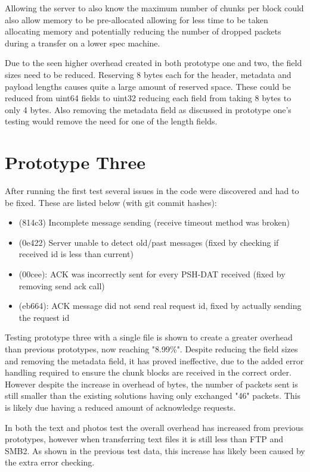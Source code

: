 Allowing the server to also know the maximum number of chunks per block could also allow memory to be pre-allocated allowing for less time to be taken allocating memory and potentially reducing the number of dropped packets during a transfer on a lower spec machine.

Due to the seen higher overhead created in both prototype one and two, the field sizes need to be reduced. Reserving 8 bytes each for the header, metadata and payload lengths causes quite a large amount of reserved space. These could be reduced from uint64 fields to uint32 reducing each field from taking 8 bytes to only 4 bytes. Also removing the metadata field as discussed in prototype one's testing would remove the need for one of the length fields.


\section{Prototype Three}
After running the first test several issues in the code were discovered and had to be fixed. These are listed below (with git commit hashes):

\begin{itemize}
    \item (814c3) Incomplete message sending (receive timeout method was broken)
    \item (0e422) Server unable to detect old/past messages (fixed by checking if received id is less than current)
    \item (00cee): ACK was incorrectly sent for every PSH-DAT received (fixed by removing send ack call)
    \item (eb664): ACK message did not send real request id, fixed by actually sending the request id
\end{itemize}

Testing prototype three with a single file is shown to create a greater overhead than previous prototypes, now reaching "8.99\%". Despite reducing the field sizes and removing the metadata field, it has proved ineffective, due to the added error handling required to ensure the chunk blocks are received in the correct order. However despite the increase in overhead of bytes, the number of packets sent is still smaller than the existing solutions having only exchanged "46" packets. This is likely due having a reduced amount of acknowledge requests.

In both the text and photos test the overall overhead has increased from previous prototypes, however when transferring text files it is still less than FTP and SMB2. As shown in the previous test data, this increase has likely been caused by the extra error checking.

